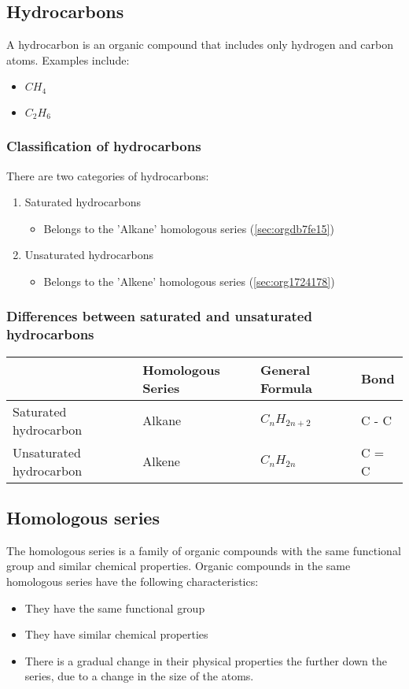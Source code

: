 \documentclass[11pt]{article}
\begin{document}
\subsection{Hydrocarbons}
\label{sec:org7604cf1}
A hydrocarbon is an organic compound that includes only hydrogen and carbon atoms. Examples include:
\begin{itemize}
\item \(CH_4\)
\item \(C_2H_6\)
\end{itemize}
\subsubsection{Classification of hydrocarbons}
\label{sec:orgf838d80}
There are two categories of hydrocarbons:
\begin{enumerate}
\item Saturated hydrocarbons
\begin{itemize}
\item Belongs to the 'Alkane' homologous series  (\ref{sec:orgdb7fe15})
\end{itemize}
\item Unsaturated hydrocarbons
\begin{itemize}
\item Belongs to the 'Alkene' homologous series (\ref{sec:org1724178})
\end{itemize}
\end{enumerate}
\subsubsection{Differences between saturated and unsaturated hydrocarbons}
\label{sec:orgfe8328c}
\begin{center}
\begin{tabular}{llll}
 & Homologous Series & General Formula & Bond\\
\hline
Saturated hydrocarbon & Alkane & \(C_nH_{2n+2}\) & C - C\\
Unsaturated hydrocarbon & Alkene & \(C_nH_{2n}\) & C = C\\
\end{tabular}
\end{center}
\subsection{Homologous series}
\label{sec:orga9b4498}
The homologous series is a family of organic compounds with the same functional group and similar chemical properties. Organic compounds in the same homologous series have the following characteristics:
\begin{itemize}
\item They have the same functional group
\item They have similar chemical properties
\item There is a gradual change in their physical properties the further down the series, due to a change in the size of the atoms.
\end{itemize}
\end{document}
